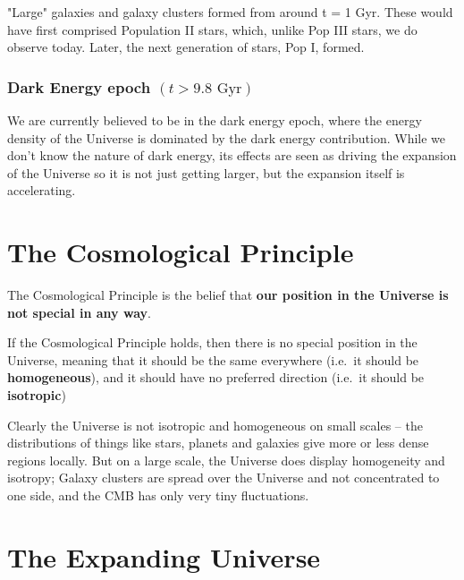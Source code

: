 \documentclass[]{book}
\begin{document}
"Large" galaxies and galaxy clusters formed from around t = 1 Gyr. These
would have first comprised Population II stars, which, unlike Pop III
stars, we do observe today. Later, the next generation of stars, Pop I,
formed.

\subsubsection*{\texorpdfstring{Dark Energy epoch
\((t > 9.8 \text{ Gyr})\)}{Dark Energy epoch (t \textgreater{} 9.8 \textbackslash{}text\{ Gyr\})}}\label{dark-energy-epoch-t-9.8-text-gyr}

We are currently believed to be in the dark energy epoch, where the
energy density of the Universe is dominated by the dark energy
contribution. While we don't know the nature of dark energy, its effects
are seen as driving the expansion of the Universe so it is not just
getting larger, but the expansion itself is accelerating.

\section{The Cosmological Principle}\label{sec:cosmoprinciple}

The Cosmological Principle is the belief that \textbf{our position in
the Universe is not special in any way}.

If the Cosmological Principle holds, then there is no special position
in the Universe, meaning that it should be the same everywhere (i.e.~it
should be \textbf{homogeneous}), and it should have no preferred
direction (i.e.~it should be \textbf{isotropic})

Clearly the Universe is not isotropic and homogeneous on small scales --
the distributions of things like stars, planets and galaxies give more
or less dense regions locally. But on a large scale, the Universe does
display homogeneity and isotropy; Galaxy clusters are spread over the
Universe and not concentrated to one side, and the CMB has only very
tiny fluctuations.

\section{The Expanding Universe}\label{sec:expanding_intro}
\end{document}

